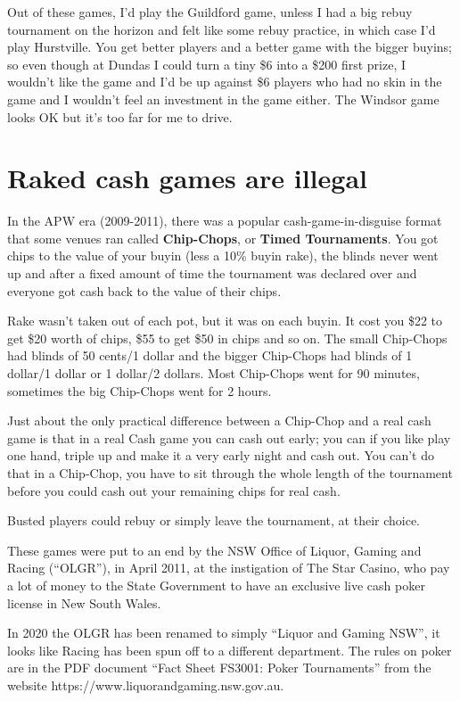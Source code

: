 Out of these games, I'd play the Guildford game, unless I had a big
rebuy tournament on the horizon and felt like some rebuy practice, in
which case I'd play Hurstville. You get better players and a better
game with the bigger buyins; so even though at Dundas I could turn a
tiny \$6 into a \$200 first prize, I wouldn't like the game and I'd be
up against \$6 players who had no skin in the game
and I wouldn't feel an investment in the game either. The Windsor game
looks OK but it's too far for me to drive.

\section{Raked cash games are illegal}

In the APW era (2009-2011), there was a popular
cash-game-in-disguise format that some venues ran
called \textbf{Chip-Chops}, or \textbf{Timed Tournaments}.
You got chips to the value of your buyin (less a 10\% buyin rake), the blinds
never went up and after a fixed amount of time the tournament was
declared over and everyone got cash back to the value of their chips.

Rake wasn't taken out of each pot, but it was on each buyin.
It cost you \$22 to get \$20 worth of chips, \$55 to get
\$50 in chips and so on. The small Chip-Chops had blinds of
50 cents/1 dollar and the bigger Chip-Chops had blinds of
1 dollar/1 dollar or 1 dollar/2 dollars. Most Chip-Chops went for 90
minutes, sometimes the big Chip-Chops went for 2 hours.

Just about the only practical difference between a
Chip-Chop and a real cash game is that in a real Cash game
you can cash out early; you can if you like play one hand,
triple up and make it a very early night and cash out.
You can't do that in a Chip-Chop, you have to sit through
the whole length of the tournament before you could cash out your
remaining chips for real cash.

Busted players could rebuy or simply leave the tournament,
at their choice.

These games were put to an end by the NSW Office of Liquor,
Gaming and Racing (``OLGR''), in April 2011, at the instigation of The
Star Casino, who pay a lot of money to the State Government to have an
exclusive live cash poker license in New South Wales.

In 2020 the OLGR has been renamed to simply
``Liquor and Gaming NSW'', it looks like Racing has been spun off to a
different department. The rules on poker are in
the PDF document ``Fact Sheet FS3001: Poker Tournaments'' from
the website https://www.liquorandgaming.nsw.gov.au.

